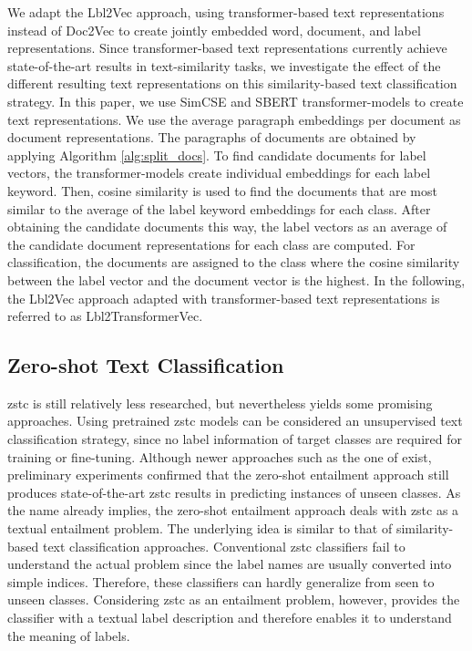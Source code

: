 \documentclass[sigconf]{acmart}
\begin{document}
We adapt the Lbl2Vec approach, using transformer-based text representations instead of Doc2Vec to create jointly embedded word, document, and label representations. Since transformer-based text representations currently achieve state-of-the-art results in text-similarity tasks, we investigate the effect of the different resulting text representations on this similarity-based text classification strategy. In this paper, we use SimCSE \cite{gao-etal-2021-simcse} and SBERT \cite{reimers-gurevych-2019-sentence} transformer-models to create text representations. We use the average paragraph embeddings per document as document representations. The paragraphs of documents are obtained by applying Algorithm \ref{alg:split_docs}. To find candidate documents for label vectors, the transformer-models create individual embeddings for each label keyword. Then, cosine similarity is used to find the documents that are most similar to the average of the label keyword embeddings for each class. After obtaining the candidate documents this way, the label vectors as an average of the candidate document representations for each class are computed. For classification, the documents are assigned to the class where the cosine similarity between the label vector and the document vector is the highest. In the following, the Lbl2Vec approach adapted with transformer-based text representations is referred to as Lbl2TransformerVec.

\subsection{Zero-shot Text Classification}\label{sec:zero-shot-entailment}

\ac{zstc} is still relatively less researched, but nevertheless yields some promising approaches. Using pretrained \ac{zstc} models can be considered an unsupervised text classification strategy, since no label information of target classes are required for training or fine-tuning. Although newer approaches such as the one of \citet{9411914} exist, preliminary experiments confirmed that the zero-shot entailment approach \cite{yin-etal-2019-benchmarking} still produces state-of-the-art \ac{zstc} results in predicting instances of unseen classes. As the name already implies, the zero-shot entailment approach deals with \ac{zstc} as a textual entailment problem. The underlying idea is similar to that of similarity-based text classification approaches. Conventional \ac{zstc} classifiers fail to understand the actual problem since the label names are usually converted into simple indices. Therefore, these classifiers can hardly generalize from seen to unseen classes. Considering \ac{zstc} as an entailment problem, however, provides the classifier with a textual label description and therefore enables it to understand the meaning of labels. 
\end{document}
